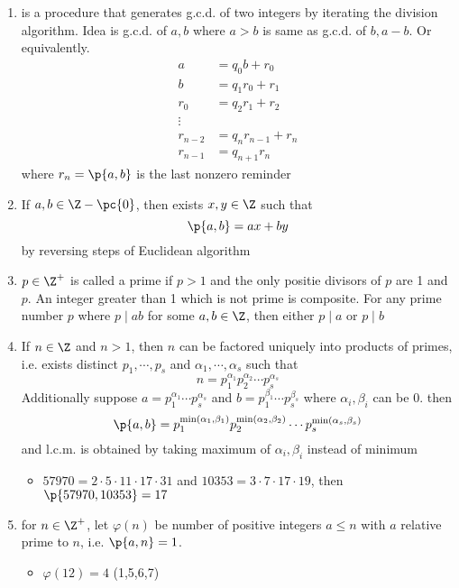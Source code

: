 \documentclass[11pt]{article}
\begin{document}
\begin{definition*}
\begin{enumerate}
        \item {} is a procedure that generates g.c.d. of two integers by iterating the division algorithm. Idea is g.c.d. of $a,b$ where $a>b$ is same as g.c.d. of $b,a-b$. Or equivalently. 
        \begin{align*}
            a &= q_0 b + r_0 \\
            b &= q_1 r_0 + r_1 \\
            r_0 &= q_2 r_1 + r_2 \\
            \vdots \\
            r_{n-2} &= q_n r_{n-1} + r_n \\
            r_{n-1} &= q_{n+1} r_n
        \end{align*}
        where $r_n = \p{a,b}$ is the last nonzero reminder
        \item {} If $a,b\in \Z -\pc{0}$, then exists $x,y\in\Z$ such that 
        \[
            \p{a,b} = ax + by    
        \]
        by reversing steps of Euclidean algorithm
        \item {} $p\in \Z^+$ is called a prime if $p>1$ and the only positie divisors of $p$ are 1 and $p$. An integer greater than 1 which is not prime is composite. For any prime number $p$ where $p\mid ab$ for some $a,b\in\Z$, then either $p\mid a$ or $p \mid b$
        \item {} If $n\in \Z$ and $n>1$, then $n$ can be factored uniquely into products of primes, i.e. exists distinct $p_1,\cdots,p_s$ and $\alpha_1,\cdots, \alpha_s$ such that 
        \[
            n = p_1^{\alpha_1} p_2^{\alpha_2} \cdots p_s^{\alpha_s}
        \]
        Additionally suppose $a = p_1^{\alpha_1} \cdots p_s^{\alpha_s}$ and $b = p_1^{\beta_1} \cdots p_s^{\beta_s}$ where $\alpha_i,\beta_i$ can be 0. then 
        \[
            \p{a,b} = p_1^{\min(\alpha_1,\beta_1)} p_2^{\min(\alpha_2,\beta_2)} \cdots p_s^{\min(\alpha_s,\beta_s)}
        \]
        and l.c.m. is obtained by taking maximum of $\alpha_i,\beta_i$ instead of minimum
        \begin{itemize}
            \item $57970 = 2\cdot 5 \cdot 11 \cdot 17 \cdot 31$ and $10353 = 3\cdot 7 \cdot 17 \cdot 19$, then $\p{57970, 10353} = 17$
        \end{itemize}
        \item {} for $n\in \Z^+$, let $\varphi(n)$ be number of positive integers $a\leq n$ with $a$ relative prime to $n$, i.e. $\p{a,n} = 1$.
        \begin{itemize}
            \item $\varphi(12)=4$ (1,5,6,7)
        \end{itemize}
    \end{enumerate}
\end{definition*}
\end{document}
